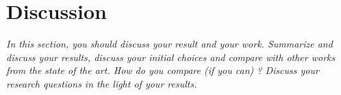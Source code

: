 \chapter{Discussion}
\label{ch:discussion}

\emph{In this section, you should discuss your result and your work. Summarize and discuss your results,  discuss your initial choices and compare with other works from the state of the art. How do you compare (if you can) ? Discuss your research questions in the light of your results. }